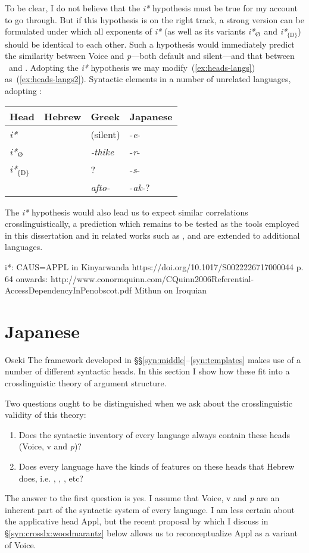 To be clear, I do not believe that the \emph{i*} hypothesis must be true for my account to go through. But if this hypothesis is on the right track, a strong version can be formulated under which all exponents of \emph{i*} (as well as its variants \emph{i*}$_{\text{\zero}}$ and \emph{i*}$_{\{\text{D}\}}$) should be identical to each other. Such a hypothesis would immediately predict the similarity between Voice and \emph{p}---both default and silent---and that between \vz~and \pz. {Adopting the \emph{i*} hypothesis we may modify~(\ref{ex:heads-langs}) as~(\ref{ex:heads-langs2}).}
\ex\label{ex:heads-langs2}Syntactic elements in a number of unrelated languages, adopting \cite{woodmarantz15}:\\
	\begin{tabular}{l|lll}
	Head 		& Hebrew 		& Greek  		& Japanese\\\hline
	\emph{i*}   	& \tkal     & (silent)      & -\emph{e}-\\
	\emph{i*}$_{\text{\zero}}$ 	& \tnif 	& \emph{-thike}	& -\emph{r}-\\
	\emph{i*}$_{\text{\{D\}}}$	& \thif		& ?		& -\emph{s}-\\
	{\va}	& \tpie		& \emph{afto-}	& -\emph{ak}-?\\
	\end{tabular}
\xe

The \emph{i*} hypothesis would also lead us to expect similar correlations crosslinguistically, a prediction which remains to be tested as the tools employed in this dissertation and in related works such as \cite{schaefer08}, \cite{spathasetal15} and \cite{wood15springer} are extended to additional languages.


i*: CAUS=APPL in Kinyarwanda https://doi.org/10.1017/S0022226717000044
p. 64 onwards: http://www.conormquinn.com/CQuinn2006Referential-AccessDependencyInPenobscot.pdf
Mithun on Iroquian

\section{Japanese}
Oseki
The framework developed in \S\S\ref{syn:middle}--\ref{syn:templates} makes use of a number of different syntactic heads. In this section I show how these fit into a crosslinguistic theory of argument structure.

Two questions ought to be distinguished when we ask about the crosslinguistic validity of this theory:
\begin{enumerate}
	\item Does the syntactic inventory of every language always contain these heads (Voice, v and \emph{p})?
	\item Does every language have the kinds of features on these heads that Hebrew does, i.e. {\vd}, \pz, \va, etc?
\end{enumerate}
The answer to the first question is yes. I assume that Voice, v and \emph{p} are an inherent part of the syntactic system of every language. I am less certain about the applicative head Appl, but the recent proposal by \cite{woodmarantz15} which I discuss in \S\ref{syn:crosslx:woodmarantz} below allows us to reconceptualize Appl as a variant of Voice.

